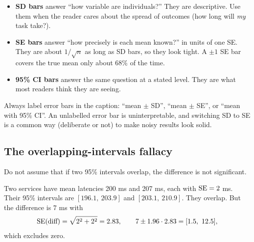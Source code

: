 \begin{itemize}
  \item \textbf{SD bars} answer ``how variable are individuals?'' They are
        descriptive. Use them when the reader cares about the spread of
        outcomes (how long will \emph{my} task take?).
  \item \textbf{SE bars} answer ``how precisely is each mean known?'' in units
        of one SE. They are about $1/\sqrt n$ as long as SD bars, so they look
        tight. A $\pm 1$ SE bar covers the true mean only about 68\% of the time.
  \item \textbf{95\% CI bars} answer the same question at a stated level. They
        are what most readers think they are seeing.
\end{itemize}

\begin{trapbox}
Always label error bars in the caption: ``mean $\pm$ SD'', ``mean $\pm$ SE'',
or ``mean with 95\% CI''. An unlabelled error bar is uninterpretable, and
switching SD to SE is a common way (deliberate or not) to make noisy results
look solid.
\end{trapbox}

\subsection{The overlapping-intervals fallacy}

Do not assume that if two 95\% intervals overlap, the difference is not
significant.

Two services have mean latencies 200 ms and 207 ms, each with $\operatorname{SE} = 2$ ms.
Their 95\% intervals are $[196.1,\ 203.9]$ and $[203.1,\ 210.9]$. They overlap.
But the difference is $7$ ms with
\[
  \operatorname{SE}(\text{diff}) = \sqrt{2^2 + 2^2} = 2.83, \qquad
  7 \pm 1.96\cdot 2.83 = [1.5,\ 12.5],
\]
which excludes zero.

